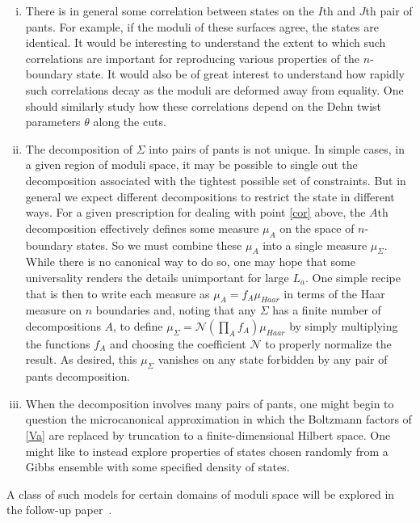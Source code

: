 \documentclass[12pt]{article}
\numberwithin{equation}{section}
\begin{document}
\begin{enumerate}[i)]

 \item {} \label{cor} There is in general some correlation between states on the $I$th and $J$th pair of pants.  For example, if the moduli of these surfaces agree, the states are identical.  It would be interesting to understand the extent to which  such correlations are important for reproducing various properties of the $n$-boundary state.  It would also be of great interest to understand how rapidly such correlations decay as the moduli are deformed away from equality.  One should similarly study how these correlations depend on the Dehn twist parameters $\theta$ along the cuts.

\item {}  The decomposition of $\Sigma$ into pairs of pants is not unique.  In simple cases, in a given region of moduli space, it may be possible to single out the decomposition associated with the tightest possible set of constraints.  But in general we expect different decompositions to restrict the state in different ways. For a given prescription for dealing with point \ref{cor} above, the $A$th decomposition effectively defines some measure $\mu_A$ on the space of $n$-boundary states.  So we must combine these $\mu_A$ into a single measure $\mu_\Sigma$.  While there is no canonical way to do so, one may hope that some universality renders the details unimportant for large $L_a$.   One simple recipe that is then to write each measure as $\mu_A = f_A \mu_{Haar}$ in terms of the Haar measure on $n$ boundaries and, noting that any $\Sigma$ has a finite number of decompositions $A$, to define $\mu_\Sigma = \mathcal{N} \left(\prod_A f_A \right) \mu_{Haar}$ by simply multiplying the functions $f_A$ and choosing the coefficient $\mathcal{N}$ to properly normalize the result.  As desired, this $\mu_\Sigma$ vanishes on any state forbidden by any pair of pants decomposition.

  \item {} When the decomposition involves many pairs of pants, one might begin to question the microcanonical approximation in which the Boltzmann factors of \eqref{Va} are replaced by truncation to a finite-dimensional Hilbert space.  One might like to instead explore properties of states chosen randomly from a Gibbs ensemble with some specified density of states.
\end{enumerate}
A class of such models for certain domains of moduli space will be explored in the follow-up paper~\cite{hayden2014random}.
\end{document}
